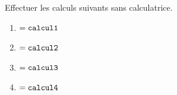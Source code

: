 \documentclass[exercice]{thedocument}%
\begin{document}
%
\begin{flushleft}
    Effectuer les calculs suivants sans calculatrice.
\end{flushleft}
\begin{enumerate}[label=\Alph*, font=\normalfont]
    \item$=\<calcul1;$
    \item$=\<calcul2;$
    \item$=\<calcul3;$
    \item$=\<calcul4;$
\end{enumerate}
\end{document}
